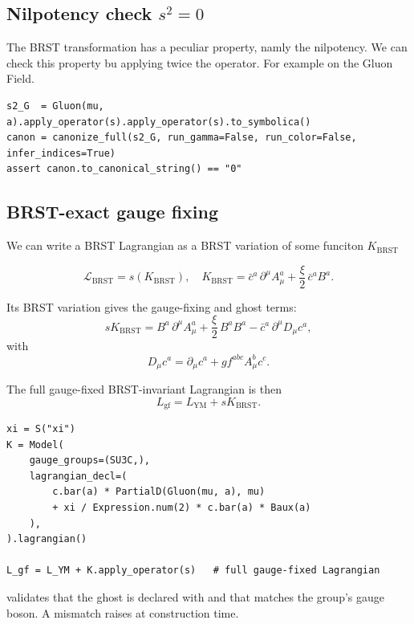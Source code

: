 \subsection*{Nilpotency check $s^2 = 0$}
The BRST transformation has a peculiar property, namly the nilpotency. We can check this property bu applying twice the operator. For example on the Gluon Field.
\begin{verbatim}
s2_G  = Gluon(mu, a).apply_operator(s).apply_operator(s).to_symbolica()
canon = canonize_full(s2_G, run_gamma=False, run_color=False, infer_indices=True)
assert canon.to_canonical_string() == "0"
\end{verbatim}

\subsection*{BRST-exact gauge fixing}

We can write a BRST Lagrangian as a BRST variation of some funciton $K_{\mathrm{BRST}}$

$$
\mathcal{L}_{\mathrm{BRST}}= s(K_{\mathrm{BRST}}), \quad K_{\mathrm{BRST}}
=
\bar c^a\,\partial^\mu A^a_\mu
+
\frac{\xi}{2}\,\bar c^a B^a .
$$

Its BRST variation gives the gauge-fixing and ghost terms:
$$
sK_{\mathrm{BRST}}
=
B^a\,\partial^\mu A^a_\mu
+
\frac{\xi}{2}\,B^a B^a
-
\bar c^a\,\partial^\mu D_\mu c^a ,
$$
with
$$
D_\mu c^a
=
\partial_\mu c^a + g f^{abc} A_\mu^b c^c .
$$



The full gauge-fixed BRST-invariant Lagrangian is then
$$
L_{\mathrm{gf}}
=
L_{\mathrm{YM}} + sK_{\mathrm{BRST}} .
$$


\begin{verbatim}
xi = S("xi")
K = Model(
    gauge_groups=(SU3C,),
    lagrangian_decl=(
        c.bar(a) * PartialD(Gluon(mu, a), mu)
        + xi / Expression.num(2) * c.bar(a) * Baux(a)
    ),
).lagrangian()

L_gf = L_YM + K.apply_operator(s)   # full gauge-fixed Lagrangian
\end{verbatim}

\begin{tcolorbox}[warnbox, title={Ghost field validation}]
 validates that the ghost is declared with
 and that  matches the group's gauge boson.
A mismatch raises  at construction time.
\end{tcolorbox}


